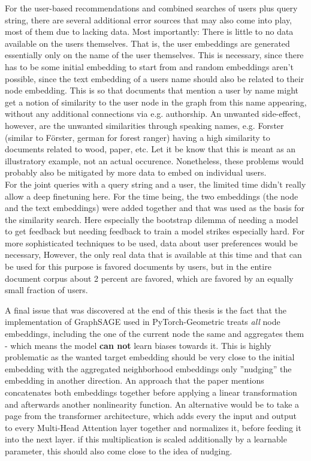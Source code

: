 \documentclass[draft,final]{vutinfth} %
\begin{document}
For the user-based recommendations and combined searches of users plus query string, there are several additional error sources that may also come into play, most of them due to lacking data. Most importantly: There is little to no data available on the users themselves. That is, the user embeddings are generated essentially only on the name of the user themselves. This is necessary, since there has to be some initial embedding to start from and random embeddings aren't possible, since the text embedding of a users name should also be related to their node embedding. This is so that documents that mention a user by name might get a notion of similarity to the user node in the graph from this name appearing, without any additional connections via e.g. authorship. An unwanted side-effect, however, are the unwanted similarities through speaking names, e.g. Forster (similar to Förster, german for forest ranger) having a high similarity to documents related to wood, paper, etc. Let it be know that this is meant as an illustratory example, not an actual occurence. Nonetheless, these problems would probably also be mitigated by more data to embed on individual users. \\
For the joint queries with a query string and a user, the limited time didn't really allow a deep finetuning here. For the time being, the two embeddings (the node and the text embeddings) were added together and that was used as the basis for the similarity search. Here especially the bootstrap dilemma of needing a model to get feedback but needing feedback to train a model strikes especially hard. For more sophisticated techniques to be used, data about user preferences would be necessary, However, the only real data that is available at this time and that can be used for this purpose is favored documents by users, but in the entire document corpus about 2 percent are favored, which are favored by an equally small fraction of users. 

A final issue that was discovered at the end of this thesis is the fact that the implementation of GraphSAGE used in PyTorch-Geometric treats \textit{all} node embeddings, including the one of the current node the same and aggregates them - which means the model \textbf{can not} learn biases towards it. This is highly problematic as the wanted target embedding should be very close to the initial embedding with the aggregated neighborhood embeddings only ''nudging'' the embedding in another direction. An approach that the paper mentions concatenates both embeddings together before applying a linear transformation and afterwards another nonlinearity function. 
An alternative would be to take a page from the transformer architecture, which adds every the input and output to every Multi-Head Attention layer together and normalizes it, before feeding it into the next layer. if this multiplication is scaled additionally by a learnable parameter, this should also come close to the idea of nudging.
\end{document}
